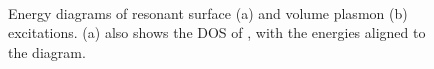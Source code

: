\begin{refsection}
\begin{figure}[ht] 
    \centering 
    \captionsetup{width=0.9\textwidth}
    \begin{subfigure}[t]{0.6\textwidth} 
        \centering 
        
         
        \caption{} 
    \end{subfigure}%
    ~  
    \begin{subfigure}[t]{0.4\textwidth} 
        \centering 
        
         
        \caption{} 
    \end{subfigure} 
\caption{Energy diagrams of resonant surface (a) and volume plasmon (b) 
excitations. (a) also shows the DOS of , with the energies 
aligned to the diagram.} 
\label{quotas:fig-plasmons} 
\end{figure} 
 

\end{refsection}

